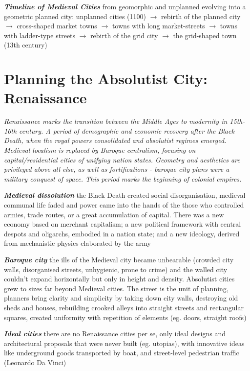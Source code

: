 \documentclass{article}
\newcommand{\bisection}[1]{\textbf{\textit{#1}}}
\begin{document}
\bisection{Timeline of Medieval Cities} from geomorphic and unplanned evolving into a geometric planned city: unplanned cities (1100) $\rightarrow$ rebirth of the planned city $\rightarrow$ cross-shaped market towns $\rightarrow$ towns with long market-streets $\rightarrow$ towns with ladder-type streets $\rightarrow$ rebirth of the grid city $\rightarrow$ the grid-shaped town (13th century)

\pagebreak
\section{Planning the Absolutist City: Renaissance}

\textit{Renaissance marks the transition between the Middle Ages to modernity in 15th-16th century. A period of demographic and economic recovery after the Black Death, when the royal powers consolidated and absolutist regimes emerged. Medieval localism is replaced by Baroque centralism, focusing on capital/residential cities of unifying nation states. Geometry and aesthetics are privileged above all else, as well as fortifications - baroque city plans were a military conquest of space. This period marks the beginning of colonial empires.}

\bisection{Medieval dissolution} the Black Death created social disorganisation, medieval communal life faded and power came into the hands of the those who controlled armies, trade routes, or a great accumulation of capital. There was a new economy based on merchant capitalism; a new political framework with central despots and oligarchs, embodied in a nation state; and a new ideology, derived from mechanistic physics elaborated by the army

\bisection{Baroque city} the ills of the Medieval city became unbearable (crowded city walls, disorganised streets, unhygienic, prone to crime) and the walled city couldn't expand horizontally but only in height and density. Absolutist cities grew to sizes far beyond Medieval cities. The street is the unit of planning, planners bring clarity and simplicity by taking down city walls, destroying old sheds and houses, rebuilding crooked alleys into straight streets and rectangular squares, created uniformity with repetition of elements (eg. doors, straight roofs)

\bisection{Ideal cities} there are no Renaissance cities per se, only ideal designs and architectural proposals that were never built (eg. utopias), with innovative ideas like underground goods transported by boat, and street-level pedestrian traffic (Leonardo Da Vinci)
\end{document}

